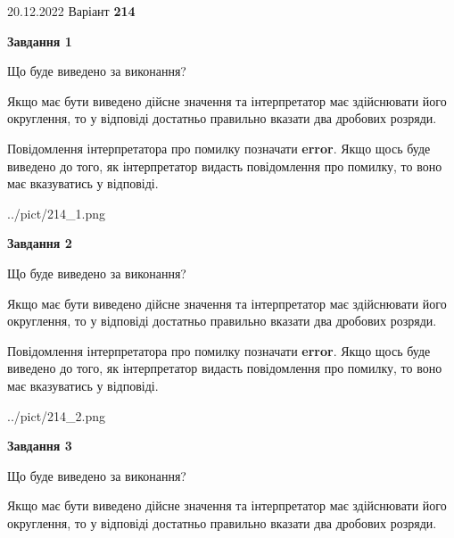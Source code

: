 \documentclass[12pt, ukrainian]{article}
\begin{document}
{20.12.2022 Варіант \No \textbf { 214 }\par}
{
\begin {Large}

{\begin {center}\textbf{Завдання 1}\end {center}}\par
Що буде виведено за виконання? \par

Якщо має бути виведено дійсне значення та інтерпретатор має здійснювати його округлення, 
то у відповіді достатньо правильно вказати два дробових розряди.

Повідомлення інтерпретатора про помилку позначати \textbf{error}.
Якщо щось буде виведено до того, як інтерпретатор видасть повідомлення про помилку, 
то воно має вказуватись у відповіді. \par

\begin{center}
	{../pict/214_1.png}
\end{center}
\newpage

{\begin {center}\textbf{Завдання 2}\end {center}}\par
Що буде виведено за виконання? \par

Якщо має бути виведено дійсне значення та інтерпретатор має здійснювати його округлення, 
то у відповіді достатньо правильно вказати два дробових розряди.

Повідомлення інтерпретатора про помилку позначати \textbf{error}.
Якщо щось буде виведено до того, як інтерпретатор видасть повідомлення про помилку, 
то воно має вказуватись у відповіді. \par

\begin{center}
	{../pict/214_2.png}
\end{center}
\newpage

{\begin {center}\textbf{Завдання 3}\end {center}}\par
Що буде виведено за виконання? \par

Якщо має бути виведено дійсне значення та інтерпретатор має здійснювати його округлення, 
то у відповіді достатньо правильно вказати два дробових розряди.


\end{Large}}
\end{document}
